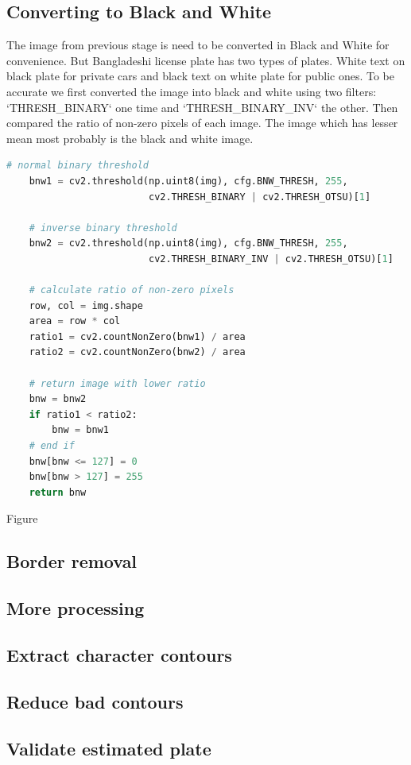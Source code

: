 \documentclass{standalone}
\begin{document}
\subsection{Converting to Black and White}
The image from previous stage is need to be converted in Black and White for convenience. But Bangladeshi license plate has two types of plates. White text on black plate for private cars and black text on white plate for public ones. To be accurate we first converted the image into black and white using two filters: `THRESH_BINARY` one time and `THRESH_BINARY_INV` the other. Then compared the ratio of non-zero pixels of each image. The image which has lesser mean most probably is the black and white image. 
\begin{lstlisting}[language=Python]
# normal binary threshold
    bnw1 = cv2.threshold(np.uint8(img), cfg.BNW_THRESH, 255,
                         cv2.THRESH_BINARY | cv2.THRESH_OTSU)[1]

    # inverse binary threshold
    bnw2 = cv2.threshold(np.uint8(img), cfg.BNW_THRESH, 255,
                         cv2.THRESH_BINARY_INV | cv2.THRESH_OTSU)[1]

    # calculate ratio of non-zero pixels
    row, col = img.shape
    area = row * col
    ratio1 = cv2.countNonZero(bnw1) / area
    ratio2 = cv2.countNonZero(bnw2) / area

    # return image with lower ratio
    bnw = bnw2
    if ratio1 < ratio2:
        bnw = bnw1
    # end if
    bnw[bnw <= 127] = 0
    bnw[bnw > 127] = 255
    return bnw
\end{lstlisting}

Figure 



\subsection{Border removal}
\subsection{More processing}
\subsection{Extract character contours}
\subsection{Reduce bad contours}
\subsection{Validate estimated plate}
\end{document}
